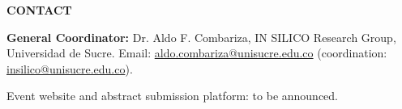 \documentclass[11pt,a4paper]{article}
\begin{document}
\vspace{0.2cm}

\noindent
\textbf{CONTACT}

\textbf{General Coordinator:} Dr. Aldo F. Combariza, IN SILICO Research Group, Universidad de Sucre.
Email: \href{mailto:aldo.combariza@unisucre.edu.co}{aldo.combariza@unisucre.edu.co}
(coordination: \href{mailto:insilico@unisucre.edu.co}{insilico@unisucre.edu.co}).

Event website and abstract submission platform: to be announced.
\end{document}
